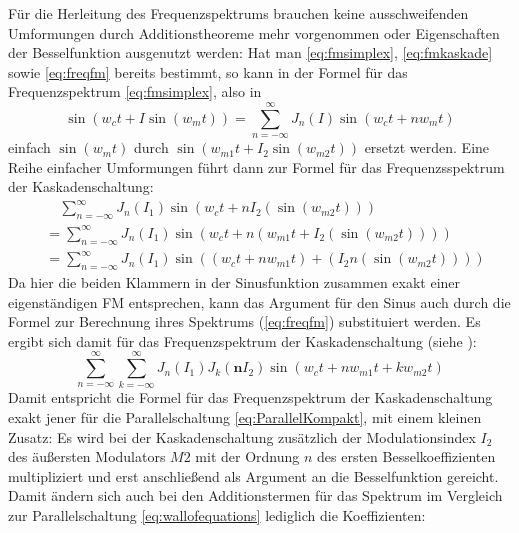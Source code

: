 Für die Herleitung des Frequenzspektrums brauchen keine ausschweifenden Umformungen durch Additionstheoreme mehr vorgenommen oder Eigenschaften der Besselfunktion ausgenutzt werden: Hat man \ref{eq:fmsimplex}, \ref{eq:fmkaskade} sowie \ref{eq:freqfm} bereits bestimmt, so kann in der Formel für das Frequenzspektrum \ref{eq:fmsimplex}, also in
\begin{equation}\label{eq:freqfm}
\sin(w_ct + I\sin(w_mt)) = \sum_{n=-\infty}^{\infty}J_n(I)\sin(w_ct+nw_mt)
\end{equation}
einfach $ \sin(w_mt) $ durch $ \sin(w_{m1}t + I_2\sin(w_{m2}t)) $ ersetzt werden. Eine Reihe einfacher Umformungen führt dann zur Formel für das Frequenzsspektrum der Kaskadenschaltung:
\begin{equation}
\begin{split}
& \quad \sum_{n=-\infty}^{\infty}J_n(I_1)\sin(w_{c}t + nI_2(\sin(w_{m2}t))) \\
&= \sum_{n=-\infty}^{\infty}J_n(I_1)\sin(w_{c}t+n(w_{m1}t + I_2(\sin(w_{m2}t)))) \\
&= \sum_{n=-\infty}^{\infty}J_n(I_1)\sin((w_{c}t+nw_{m1}t) + (I_2n(\sin(w_{m2}t))))
\end{split}
\end{equation}
Da hier die beiden Klammern in der Sinusfunktion zusammen exakt einer eigenständigen FM entsprechen, kann das Argument für den Sinus auch durch die Formel zur Berechnung ihres Spektrums (\ref{eq:freqfm}) substituiert werden. Es ergibt sich damit für das Frequenzspektrum der Kaskadenschaltung (siehe \cite{schottiWeb}):
\begin{equation}
\sum_{n=-\infty}^{\infty}\sum_{k=-\infty}^{\infty}J_n(I_1)J_k(\mathbf{n}I_2)\sin(w_{c}t+nw_{m1}t + kw_{m2}t)
\end{equation}
Damit entspricht die Formel für das Frequenzspektrum der Kaskadenschaltung exakt jener für die Parallelschaltung \ref{eq:ParallelKompakt}, mit einem kleinen Zusatz: Es wird bei der Kaskadenschaltung zusätzlich der Modulationsindex $ I_2 $ des äußersten Modulators $M2$ mit der Ordnung $ n $ des ersten Besselkoeffizienten multipliziert und erst anschließend als Argument an die Besselfunktion gereicht. Damit ändern sich auch bei den Additionstermen für das Spektrum im Vergleich zur Parallelschaltung \ref{eq:wallofequations} lediglich die Koeffizienten:
